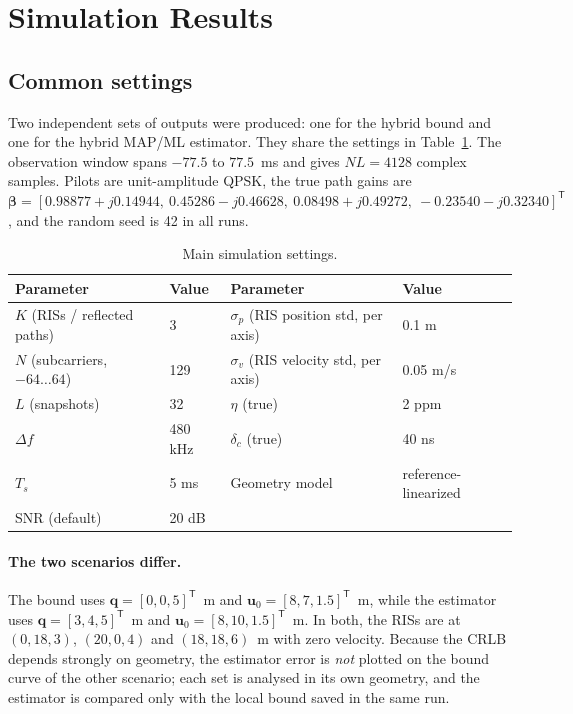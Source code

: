 \documentclass[11pt,a4paper]{article}
\newcommand{\vect}[1]{\bm{#1}}
\newcommand{\T}{\mathsf{T}}
\begin{document}
\section{Simulation Results}

\subsection{Common settings}
Two independent sets of outputs were produced: one for the hybrid bound and one for the hybrid MAP/ML estimator.
They share the settings in Table~\ref{tab:settings}. The observation window spans $-77.5$ to $77.5$~ms and gives
$NL=4128$ complex samples. Pilots are unit-amplitude QPSK, the true path gains are
$\vect{\beta}=[0.98877+j0.14944,\ 0.45286-j0.46628,\ 0.08498+j0.49272,\ -0.23540-j0.32340]^{\T}$, and the random
seed is 42 in all runs.

\begin{table}[H]
\centering
\caption{Main simulation settings.}
\label{tab:settings}
\begin{tabular}{llll}
\toprule
Parameter & Value & Parameter & Value\\
\midrule
$K$ (RISs / reflected paths) & 3 & $\sigma_p$ (RIS position std, per axis) & 0.1 m\\
$N$ (subcarriers, $-64\dots64$) & 129 & $\sigma_v$ (RIS velocity std, per axis) & 0.05 m/s\\
$L$ (snapshots) & 32 & $\eta$ (true) & 2 ppm\\
$\Delta f$ & 480 kHz & $\delta_c$ (true) & 40 ns\\
$T_s$ & 5 ms & Geometry model & reference-linearized\\
SNR (default) & 20 dB & & \\
\bottomrule
\end{tabular}
\end{table}

\paragraph{The two scenarios differ.} The bound uses $\vect{q}=[0,0,5]^{\T}$~m and $\vect{u}_0=[8,7,1.5]^{\T}$~m,
while the estimator uses $\vect{q}=[3,4,5]^{\T}$~m and $\vect{u}_0=[8,10,1.5]^{\T}$~m. In both, the RISs are at
$(0,18,3)$, $(20,0,4)$ and $(18,18,6)$~m with zero velocity. Because the CRLB depends strongly on geometry, the
estimator error is \emph{not} plotted on the bound curve of the other scenario; each set is analysed in its own
geometry, and the estimator is compared only with the local bound saved in the same run.
\end{document}
